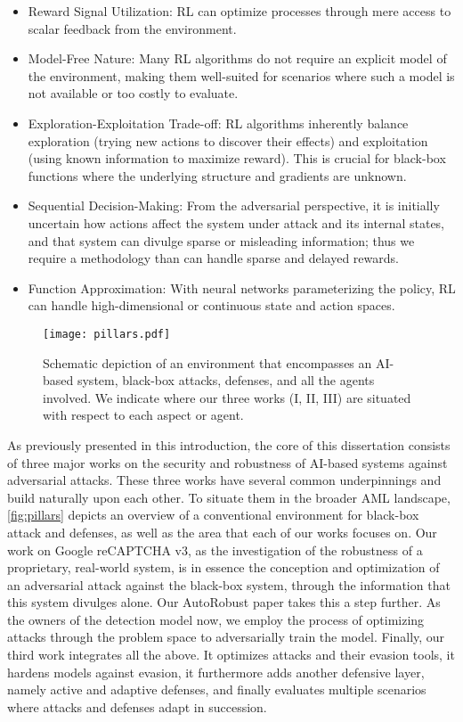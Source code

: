 \begin{itemize}
    \item Reward Signal Utilization: RL can optimize processes through mere access to scalar feedback from the environment.
    \item Model-Free Nature: Many RL algorithms do not require an explicit model of the environment, making them well-suited for scenarios where such a model is not available or too costly to evaluate.
    \item Exploration-Exploitation Trade-off: RL algorithms inherently balance exploration (trying new actions to discover their effects) and exploitation (using known information to maximize reward). This is crucial for black-box functions where the underlying structure and gradients are unknown.
    \item Sequential Decision-Making: From the adversarial perspective, it is initially uncertain how actions affect the system under attack and its internal states, and that system can divulge sparse or misleading information; thus we require a methodology than can handle sparse and delayed rewards.
    \item Function Approximation: With neural networks parameterizing the policy, RL can handle high-dimensional or continuous state and action spaces.
\end{itemize}


\begin{figure}
    \centering
    \texttt{[image: pillars.pdf]}
    \caption{Schematic depiction of an environment that encompasses an AI-based system, black-box attacks, defenses, and all the agents involved. We indicate where our three works (I, II, III) are situated with respect to each aspect or agent.}
    \label{fig:pillars}
\end{figure}

As previously presented in this introduction, the core of this dissertation consists of three major works on the security and robustness of AI-based systems against adversarial attacks.
These three works have several common underpinnings and build naturally upon each other.
To situate them in the broader \gls{AML} landscape, \autoref{fig:pillars} depicts an overview of a conventional environment for black-box attack and defenses, as well as the area that each of our works focuses on.
Our work on Google reCAPTCHA v3, as the investigation of the robustness of a proprietary, real-world system, is in essence the conception and optimization of an adversarial attack against the black-box system, through the information that this system divulges alone.
Our AutoRobust paper takes this a step further.
As the owners of the detection model now, we employ the process of optimizing attacks through the problem space to adversarially train the model.
Finally, our third work integrates all the above.
It optimizes attacks and their evasion tools, it hardens models against evasion, it furthermore adds another defensive layer, namely active and adaptive defenses, and finally evaluates multiple scenarios where attacks and defenses adapt in succession.

